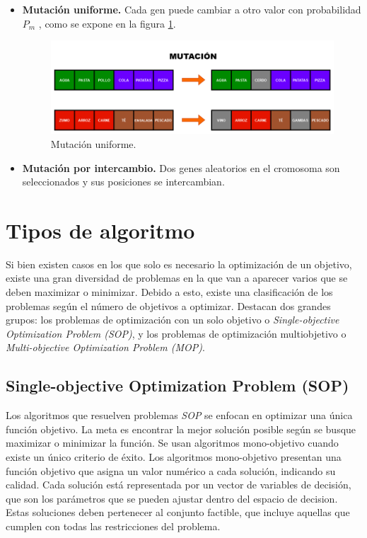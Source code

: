 \begin{itemize}
  \item \textbf{Mutación uniforme.} Cada gen puede cambiar a otro valor con probabilidad \(P_m\) , como se expone en la figura \ref{fig:mutación}.

  \begin{figure}[H]
    \centering
    \includegraphics[width=1\textwidth]{figures/mutacion.png}
    \caption{Mutación uniforme.}
    \label{fig:mutación}
  \end{figure}

  \item \textbf{Mutación por intercambio.} Dos genes aleatorios en el cromosoma son seleccionados y sus posiciones se intercambian. 
\end{itemize}

\section{Tipos de algoritmo}

Si bien existen casos en los que solo es necesario la optimización de un objetivo, existe una gran diversidad de problemas en la que van a aparecer varios que se deben maximizar o minimizar. Debido a esto, existe una clasificación de los problemas según el número de objetivos a optimizar. Destacan dos grandes grupos: los problemas de optimización con un solo objetivo o \textit{Single-objective Optimization Problem (SOP)}, y los problemas de optimización multiobjetivo o \textit{Multi-objective Optimization Problem (MOP)}.

\subsection{Single-objective Optimization Problem (SOP)}

Los algoritmos que resuelven problemas \textit{SOP} se enfocan en optimizar una única función objetivo. La meta es encontrar la mejor solución posible según se busque maximizar o minimizar la función. Se usan algoritmos mono-objetivo cuando existe un único criterio de éxito.
\newpage
Los algoritmos mono-objetivo presentan una función objetivo que asigna un valor numérico a cada solución, indicando su calidad. Cada solución está representada por un vector de variables de decisión, que son los parámetros que se pueden ajustar dentro del espacio de decision. Estas soluciones deben pertenecer al conjunto factible, que incluye aquellas que cumplen con todas las restricciones del problema.

